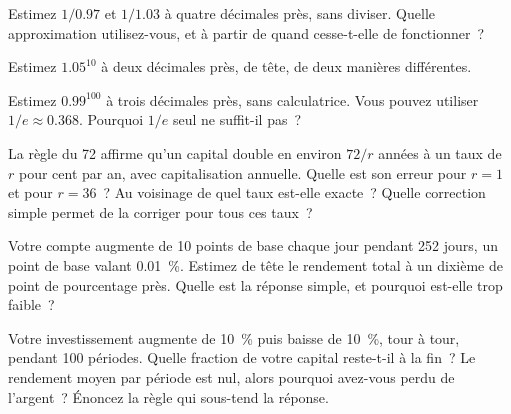 \begin{question}\label{iq:iv1:mental-technique:25}
Estimez $1/0.97$ et $1/1.03$ à quatre décimales près, sans diviser. Quelle approximation utilisez-vous, et à partir de quand cesse-t-elle de fonctionner~?
\end{question}

\begin{question}\label{iq:iv1:mental-technique:26}
Estimez $1.05^{10}$ à deux décimales près, de tête, de deux manières différentes.
\end{question}

\begin{question}\label{iq:iv1:mental-technique:27}
Estimez $0.99^{100}$ à trois décimales près, sans calculatrice. Vous pouvez utiliser $1/e \approx 0.368$. Pourquoi $1/e$ seul ne suffit-il pas~?
\end{question}

\begin{question}\label{iq:iv1:mental-technique:28}
La règle du 72 affirme qu'un capital double en environ $72/r$ années à un taux de $r$ pour cent par an, avec capitalisation annuelle. Quelle est son erreur pour $r = 1$ et pour $r = 36$~? Au voisinage de quel taux est-elle exacte~? Quelle correction simple permet de la corriger pour tous ces taux~?
\end{question}

\begin{question}\label{iq:iv1:mental-technique:29}
Votre compte augmente de 10 points de base chaque jour pendant 252 jours, un point de base valant 0.01~\%. Estimez de tête le rendement total à un dixième de point de pourcentage près. Quelle est la réponse simple, et pourquoi est-elle trop faible~?
\end{question}

\begin{question}\label{iq:iv1:mental-technique:30}
Votre investissement augmente de 10~\% puis baisse de 10~\%, tour à tour, pendant 100 périodes. Quelle fraction de votre capital reste-t-il à la fin~? Le rendement moyen par période est nul, alors pourquoi avez-vous perdu de l'argent~? Énoncez la règle qui sous-tend la réponse.
\end{question}

